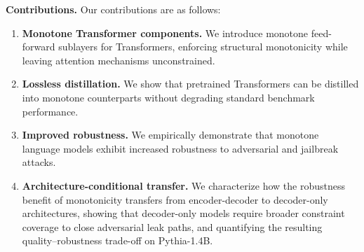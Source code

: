 \documentclass{article}
\theoremstyle{plain}
\theoremstyle{definition}
\theoremstyle{remark}
\begin{document}
\noindent\textbf{Contributions.}
Our contributions are as follows:
\vspace{-1em}
\begin{enumerate}
\item \textbf{Monotone Transformer components.} We introduce monotone feed-forward sublayers for Transformers, enforcing structural monotonicity while leaving attention mechanisms unconstrained.
\item \textbf{Lossless distillation.} We show that pretrained Transformers can be distilled into monotone counterparts without degrading standard benchmark performance.
\item \textbf{Improved robustness.} 
We empirically demonstrate that monotone language models exhibit increased robustness to adversarial and jailbreak attacks.
\item \textbf{Architecture-conditional transfer.} We characterize how the robustness benefit of monotonicity transfers from encoder-decoder to decoder-only architectures, showing that decoder-only models require broader constraint coverage to close adversarial leak paths, and quantifying the resulting quality--robustness trade-off on Pythia-1.4B.

\end{enumerate}

\end{document}
